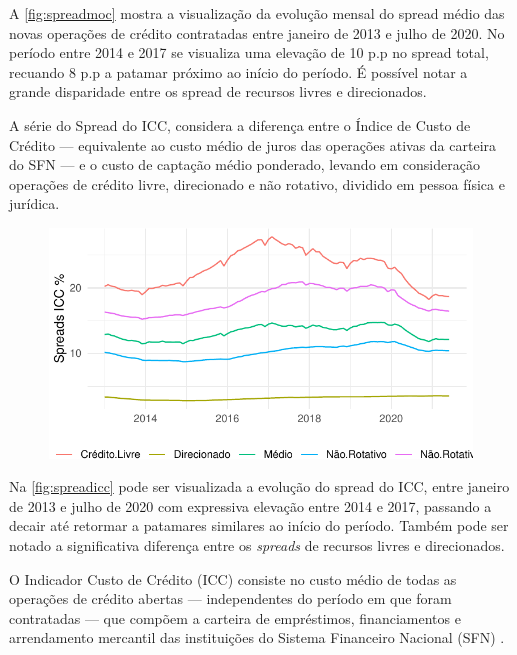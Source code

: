 \documentclass[12pt,openright,oneside,a4paper,chapter=TITLE,section=TITLE,subsection=TITLE,english,french,spanish,portugues,sumario=tradicional]{abntex2}
\begin{document}
A \autoref{fig:spreadmoc} mostra a visualização da evolução mensal do spread
médio das novas operações de crédito contratadas entre janeiro de 2013 e julho
de 2020. No período entre 2014 e 2017 se visualiza uma elevação de 10 p.p no
spread total, recuando 8 p.p a patamar próximo ao início do período. É possível
notar a grande disparidade entre os spread de recursos livres e direcionados.

A série do Spread do ICC, considera a diferença entre o Índice de Custo de
Crédito --- equivalente ao custo médio de juros das operações ativas da carteira
do SFN --- e o custo de captação médio ponderado, levando em consideração
operações de crédito livre, direcionado e não rotativo, dividido em pessoa
física e jurídica.

\begin{figure}

\begin{center}\includegraphics{12-exportedfigures/spread 2019 icc-1} \end{center}
\label{fig:spreadicc}
\end{figure}

Na \autoref{fig:spreadicc} pode ser visualizada a evolução do spread do ICC,
entre janeiro de 2013 e julho de 2020 com expressiva elevação entre 2014 e
2017, passando a decair até retormar a patamares similares ao início do
período. Também pode ser notado a significativa diferença entre os \emph{spreads} de
recursos livres e direcionados.

O Indicador Custo de Crédito (ICC) consiste no custo médio de todas as
operações de crédito abertas --- independentes do período em que foram
contratadas --- que compõem a carteira de empréstimos, financiamentos e
arrendamento mercantil das instituições do Sistema Financeiro Nacional (SFN) \cite{BCB:2000}.
\end{document}
